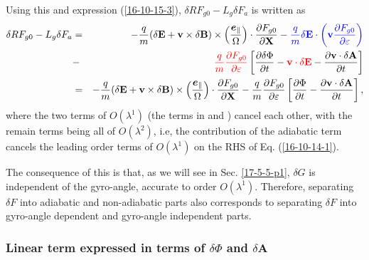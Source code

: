 \documentclass{llncs}
\newcommand{\tmcolor}[2]{{\color{#1}{#2}}}
\newcommand{\tmmathbf}[1]{\ensuremath{\boldsymbol{#1}}}
\begin{document}
Using this and expression (\ref{16-10-15-3}), $\delta R F_{g 0} - L_g \delta
F_a$ is written as
\begin{eqnarray}
  \delta R F_{g 0} - L_g \delta F_a & = & - \frac{q}{m} (\delta
  \mathbf{E}+\mathbf{v} \times \delta \mathbf{B}) \times \left(
  \frac{\tmmathbf{e}_{\parallel}}{\Omega}  \right) \cdot \frac{\partial F_{g
  0}}{\partial \mathbf{X}} - \tmcolor{blue}{\frac{q}{m} \delta \mathbf{E}
  \cdot \left( \mathbf{v} \frac{\partial F_{g 0}}{\partial \varepsilon}
  \right)} \nonumber\\
  & - & \tmcolor{red}{\frac{q}{m}  \frac{\partial F_{g 0}}{\partial
  \varepsilon}} \left[ \frac{\partial \delta \Phi}{\partial t} -
  \tmcolor{red}{\mathbf{v} \cdot \delta \mathbf{E}} - \frac{\partial
  \mathbf{v} \cdot \delta \mathbf{A}}{\partial t} \right] \nonumber\\
  & = & - \frac{q}{m} (\delta \mathbf{E}+\mathbf{v} \times \delta \mathbf{B})
  \times \left( \frac{\tmmathbf{e}_{\parallel}}{\Omega}  \right) \cdot
  \frac{\partial F_{g 0}}{\partial \mathbf{X}} - \frac{q}{m}  \frac{\partial
  F_{g 0}}{\partial \varepsilon} \left[ \frac{\partial \Phi}{\partial t} -
  \frac{\partial \mathbf{v} \cdot \delta \mathbf{A}}{\partial t} \right], 
  \label{16-10-13-e6}
\end{eqnarray}
where the two terms of $O (\lambda^1)$ (the terms in \tmcolor{blue}{blue} and
\tmcolor{red}{red}) cancel each other, with the remain terms being all of $O
(\lambda^2)$, i.e, the contribution of the adiabatic term cancels the leading
order terms of $O (\lambda^1)$ on the RHS of Eq. (\ref{16-10-14-1}).

The consequence of this is that, as we will see in Sec. \ref{17-5-5-p1},
$\delta G$ is independent of the gyro-angle, accurate to order $O
(\lambda^1)$. Therefore, separating $\delta F$ into adiabatic and
non-adiabatic parts also corresponds to separating $\delta F$ into gyro-angle
dependent and gyro-angle independent parts.

\subsubsection{Linear term expressed in terms of $\delta \Phi$ and $\delta
\mathbf{A}$}
\end{document}
